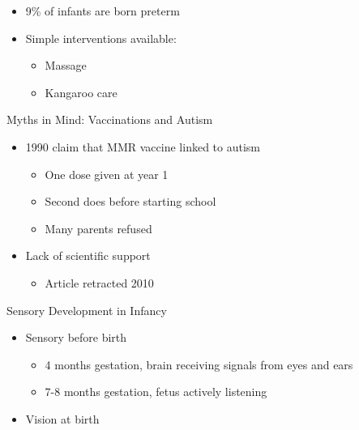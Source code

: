 \documentclass[
]{book}
\providecommand{\tightlist}{%
  \setlength{\itemsep}{0pt}\setlength{\parskip}{0pt}}
\begin{document}
\begin{reflect}
\begin{itemize}
  \begin{itemize}
  \tightlist
  \item
    9\% of infants are born preterm\\
  \item
    Simple interventions available:

    \begin{itemize}
    \tightlist
    \item
      Massage\\
    \item
      Kangaroo care
    \end{itemize}
  \end{itemize}
\end{itemize}

Myths in Mind: Vaccinations and Autism

\begin{itemize}
\tightlist
\item
  1990 claim that MMR vaccine linked to autism

  \begin{itemize}
  \tightlist
  \item
    One dose given at year 1\\
  \item
    Second does before starting school\\
  \item
    Many parents refused\\
  \end{itemize}
\item
  Lack of scientific support

  \begin{itemize}
  \tightlist
  \item
    Article retracted 2010
  \end{itemize}
\end{itemize}

Sensory Development in Infancy

\begin{itemize}
\tightlist
\item
  Sensory before birth

  \begin{itemize}
  \tightlist
  \item
    4 months gestation, brain receiving signals from eyes and ears\\
  \item
    7-8 months gestation, fetus actively listening\\
  \end{itemize}
\item
  Vision at birth


\end{itemize}
\end{reflect}
\end{document}
